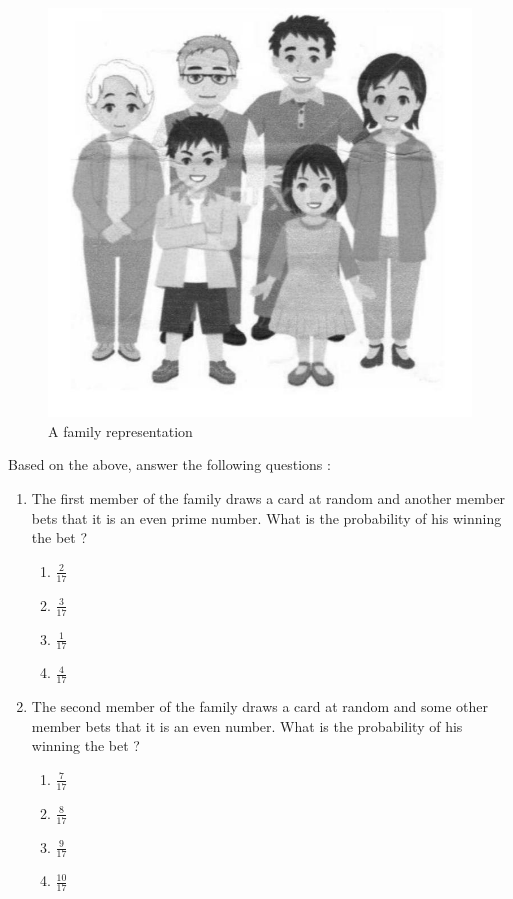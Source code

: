 \documentclass{article}
\begin{document}
\begin{enumerate}
	\begin{figure}[h!]
		\centering
		\includegraphics[width=\columnwidth]{figs/1.jpg}
		\caption{A family representation}
		\label{fig:1}
	\end{figure} 
Based on the above, answer the following questions : 		
\begin{enumerate}
\item The first member of the family draws a card at random and another member bets that it is an even prime number. What is the probability of his winning the bet ? 
	\begin{enumerate}
	\item $\frac{2}{17}$
	\item $\frac{3}{17}$
	\item $\frac{1}{17}$ 
	\item $\frac{4}{17}$ 
	\end{enumerate}
\item The second member of the family draws a card at random and some other member bets that it is an even number. What is the probability of his winning the bet ? 
	\begin{enumerate}
	\item $\frac{7}{17}$
	\item $\frac{8}{17}$
	\item $\frac{9}{17}$ 
	\item $\frac{10}{17}$ 

\end{enumerate}
\end{enumerate}
\end{enumerate}
\end{document}
